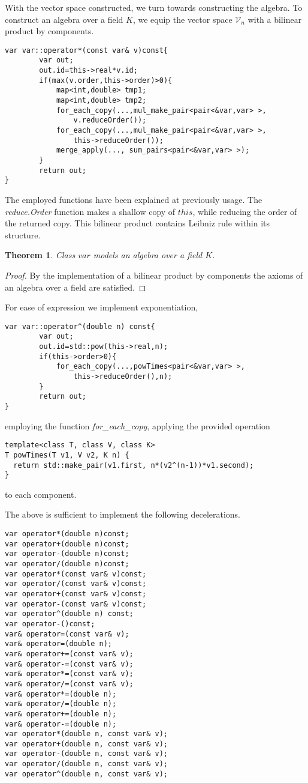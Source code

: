 \documentclass{article}
\newcommand{\VV}{\mathcal{V}}
\newtheorem{izrek}{Theorem}[section]
\begin{document}
With the vector space constructed, we turn towards constructing the algebra. To construct an algebra over a field $K$, we equip the vector space $\VV_n$ with a bilinear product by components.

\begin{lstlisting}
var var::operator*(const var& v)const{
		var out;
        out.id=this->real*v.id;
        if(max(v.order,this->order)>0){
        	map<int,double> tmp1;
        	map<int,double> tmp2;
        	for_each_copy(...,mul_make_pair<pair<&var,var> >, 
        		v.reduceOrder());
        	for_each_copy(...,mul_make_pair<pair<&var,var> >, 
        		this->reduceOrder());
        	merge_apply(..., sum_pairs<pair<&var,var> >);
        }
        return out;
}
\end{lstlisting}
The employed functions have been explained at previously usage. The \emph{reduce.Order} function makes a shallow copy of $this$, while reducing the order of the returned copy. This bilinear product contains Leibniz rule within its structure.

\begin{izrek}
Class $var$ models an algebra over a field $K$.
\end{izrek}
\begin{proof}
By the implementation of a bilinear product by components the axioms of an algebra over a field are satisfied.
\end{proof}

For ease of expression we implement exponentiation,

\begin{lstlisting}
var var::operator^(double n) const{
		var out;
        out.id=std::pow(this->real,n);
        if(this->order>0){
        	for_each_copy(...,powTimes<pair<&var,var> >, 
        		this->reduceOrder(),n);
        }
        return out;
}
\end{lstlisting}
employing the function \emph{for\_each\_copy}, applying the provided operation 
\begin{lstlisting}
template<class T, class V, class K>
T powTimes(T v1, V v2, K n) {
  return std::make_pair(v1.first, n*(v2^(n-1))*v1.second);
}
\end{lstlisting}
to each component.

The above is sufficient to implement the following decelerations.
\begin{lstlisting}
var operator*(double n)const;
var operator+(double n)const;
var operator-(double n)const;
var operator/(double n)const;
var operator*(const var& v)const;
var operator/(const var& v)const;
var operator+(const var& v)const;
var operator-(const var& v)const;
var operator^(double n) const;
var operator-()const;
var& operator=(const var& v);
var& operator=(double n);
var& operator+=(const var& v);
var& operator-=(const var& v);
var& operator*=(const var& v);
var& operator/=(const var& v);
var& operator*=(double n);
var& operator/=(double n);
var& operator+=(double n);
var& operator-=(double n);
var operator*(double n, const var& v);
var operator+(double n, const var& v);
var operator-(double n, const var& v);
var operator/(double n, const var& v);
var operator^(double n, const var& v);
\end{lstlisting} 
\end{document}
